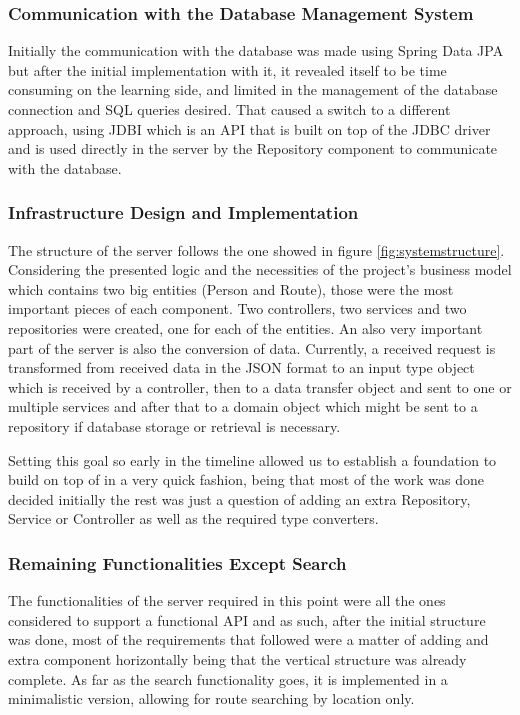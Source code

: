 \documentclass{article}
\begin{document}
            \subsubsection*{Communication with the Database Management System}
            Initially the communication with the database was made using Spring Data JPA \cite{springjpadocs} but after the initial implementation with it, it revealed 
            itself to be time consuming on the learning side, and limited in the management of the database connection and SQL queries desired. 
            That caused a switch to a different approach, using JDBI \cite{jdbidocs} which is an API that is built on top of the JDBC driver \cite{jdbcdocs} and is used directly in the server by the Repository component to communicate with the database.        

            \subsubsection*{Infrastructure Design and Implementation}
            The structure of the server follows the one showed in figure \ref{fig:systemstructure}. 
            Considering the presented logic and the necessities of the project's business model which contains two big entities (Person and Route), those were the most important pieces of each component.
            Two controllers, two services and two repositories were created, one for each of the entities.
            An also very important part of the server is also the conversion of data. Currently, a received request is transformed from received data in the JSON format to an input type object which is received by a controller, then to a data 
            transfer object and sent to one or multiple services and after that to a domain object which might be sent to a repository if database storage or retrieval is necessary.

            Setting this goal so early in the timeline allowed us to establish a foundation to build on top of in a very quick fashion, being that most of the work was done decided initially the rest 
            was just a question of adding an extra Repository, Service or Controller as well as the required type converters. 

            \subsubsection*{Remaining Functionalities Except Search}
            The functionalities of the server required in this point were all the ones considered to support a functional API and as such, after the initial structure was done, most of the requirements
            that followed were a matter of adding and extra component horizontally being that the vertical structure was already complete. As far as the search functionality goes, it is implemented in 
            a minimalistic version, allowing for route searching by location only.
\end{document}
